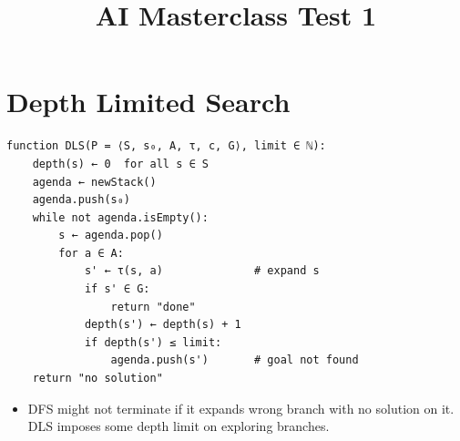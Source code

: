 \documentclass[12pt, a4paper]{article}
\title{AI Masterclass Test 1}
\author{}
\date{}
\begin{document}
\section{Depth Limited Search}
\begin{algorithm}[H]
\end{algorithm}
\begin{Verbatim}
function DLS(P = ⟨S, s₀, A, τ, c, G⟩, limit ∈ ℕ):
    depth(s) ← 0  for all s ∈ S
    agenda ← newStack()
    agenda.push(s₀)
    while not agenda.isEmpty():
        s ← agenda.pop()
        for a ∈ A:
            s' ← τ(s, a)              # expand s
            if s' ∈ G:
                return "done"
            depth(s') ← depth(s) + 1
            if depth(s') ≤ limit:
                agenda.push(s')       # goal not found
    return "no solution"
\end{Verbatim}

\begin{itemize}
    \item DFS might not terminate if it expands wrong branch with no solution on it.
DLS imposes some depth limit on exploring branches.
\end{itemize}
\end{document}
